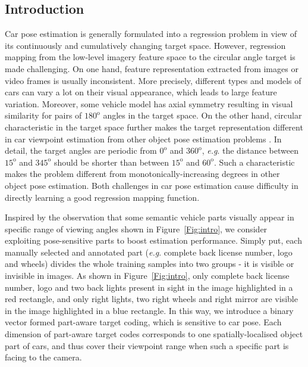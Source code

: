 \documentclass{tutmscthesis}[2010/09/22]
\numberwithin{equation}{section}
\numberwithin{table}{section}
\numberwithin{figure}{section}
\def\onedot{. }
\def\eg{\emph{e.g}\onedot} \def\Eg{\emph{E.g}\onedot}
\begin{document}
\subsection{Introduction}
Car pose estimation is generally formulated into a regression problem in view of its continuously and cumulatively changing target space. 
However, regression mapping from the low-level imagery feature space to the circular angle target is made challenging.
On one hand, feature representation extracted from images or video frames is usually inconsistent. 
More precisely, different types and models of cars can vary a lot on their visual appearance, which leads to large feature variation. 
Moreover, some vehicle model has axial symmetry resulting in visual similarity for pairs of $180^\text{o}$ angles in the target space. 
On the other hand, circular characteristic in the target space further makes the target representation different in car viewpoint estimation from other object pose estimation problems \cite{guo08icpr, ding2016articulated, kong2015head, fanelli2011real}. 
In detail, the target angles are periodic from $0^\text{o}$ and $360^\text{o}$, \eg the distance between $15^\text{o}$ and $345^\text{o}$ should be shorter than between $15^\text{o}$ and $60^\text{o}$. 
Such a characteristic makes the problem different from monotonically-increasing degrees in other object pose estimation. 
Both challenges in car pose estimation cause difficulty in directly learning a good regression mapping function. 

Inspired by the observation that some semantic vehicle parts visually appear in specific range of viewing angles shown in Figure~\ref{Fig:intro}, we consider exploiting pose-sensitive parts to boost estimation performance. 
Simply put, each manually selected and annotated part (\eg complete back license number, logo and wheels) divides the whole training samples into two groups - it is visible or invisible in images. 
As shown in Figure~\ref{Fig:intro}, only complete back license number, logo and two back lights present in sight in the image highlighted in a red rectangle, and only right lights, two right wheels and right mirror are visible in the image highlighted in a blue rectangle. 
In this way, we introduce a binary vector formed part-aware target coding, which is sensitive to car pose. 
Each dimension of part-aware target codes corresponds to one spatially-localised object part of cars, and thus cover their viewpoint range when such a specific part is facing to the camera. 
\end{document}
